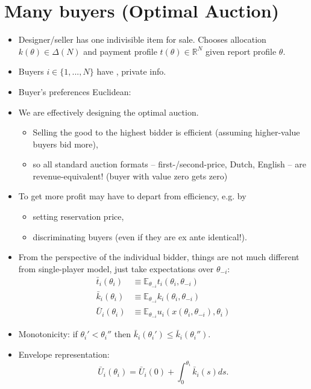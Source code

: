 \documentclass[english,handout]{beamer}		%
\def\lyxframeend{} %
\begin{document}
\section{Many buyers (Optimal Auction)}

\begin{itemize}
	\item Designer/seller has one indivisible item for sale. Chooses allocation $k(\theta) \in \varDelta(N)$ and payment profile $t(\theta) \in \mathbb{R}^N$ given report profile $\theta$.
	\item Buyers $i \in \{1,...,N\}$ have , private info.
	\item Buyer's preferences Euclidean: 
\end{itemize}
\lyxframeend


\begin{itemize}
	\item We are effectively designing the optimal auction.
	\begin{itemize}
		\item Selling the good to the highest bidder is efficient (assuming higher-value buyers bid more),
		\item so all standard auction formats -- first-/second-price, Dutch, English -- are revenue-equivalent! (buyer with value zero gets zero)
	\end{itemize}
	\item To get more profit may have to depart from efficiency, e.g. by
	\begin{itemize}
		\item setting reservation price,
		\item discriminating buyers (even if they are ex ante identical!).
	\end{itemize}
\end{itemize}
\lyxframeend


\begin{itemize}
	\item From the perspective of the individual bidder, things are not much different from single-player model, just take expectations over $\theta_{-i}$:
	\begin{align*}
		\bar{t}_i(\theta_i) &\equiv \mathbb{E}_{\theta_{-i}} t_i(\theta_i,\theta_{-i})
		\\
		\bar{k}_i(\theta_i) &\equiv \mathbb{E}_{\theta_{-i}} k_i(\theta_i,\theta_{-i})
		\\
		\bar{U}_i(\theta_i) &\equiv \mathbb{E}_{\theta_{-i}} u_i(x(\theta_i,\theta_{-i}),\theta_i)
	\end{align*}
	\item Monotonicity: if $\theta_i' < \theta_i''$ then 
	$\bar{k}_i(\theta_i') \leq \bar{k}_i(\theta_i'').$
	\item Envelope representation: 
	$$\bar{U}_i(\theta_i) = \bar{U}_i(0) + \int_0^{\theta_i} \bar{k}_i(s) ds.$$
\end{itemize}
\vspace{-1ex}
\lyxframeend
\end{document}
